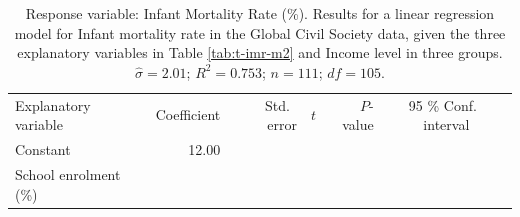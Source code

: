 \documentclass[11pt,a4paper,openany]{book}
\begin{document}
\begin{longtable}[]{@{}lrrrrc@{}}
\caption{\label{tab:t-imr-m3} Response variable: Infant Mortality Rate (\%).
Results for a linear regression model for Infant mortality rate in the
Global Civil Society data, given the three explanatory variables in
Table \ref{tab:t-imr-m2} and Income level in three groups.
\(\hat{\sigma}=2.01\); \(R^{2}=0.753\); \(n=111\);
\(df=105\).}\tabularnewline
\toprule
\begin{minipage}[t]{0.44\columnwidth}\raggedright\strut
Explanatory variable\strut
\end{minipage} & \begin{minipage}[t]{0.09\columnwidth}\raggedleft\strut
Coefficient\strut
\end{minipage} & \begin{minipage}[t]{0.05\columnwidth}\raggedleft\strut
Std.~ error\strut
\end{minipage} & \begin{minipage}[t]{0.06\columnwidth}\raggedleft\strut
\(t\)\strut
\end{minipage} & \begin{minipage}[t]{0.08\columnwidth}\raggedleft\strut
\(P\)-value\strut
\end{minipage} & \begin{minipage}[t]{0.10\columnwidth}\centering\strut
95 \% Conf.~ interval\strut
\end{minipage}\tabularnewline
\begin{minipage}[t]{0.44\columnwidth}\raggedright\strut
Constant\strut
\end{minipage} & \begin{minipage}[t]{0.09\columnwidth}\raggedleft\strut
12.00\strut
\end{minipage} & \begin{minipage}[t]{0.05\columnwidth}\raggedleft\strut
\strut
\end{minipage} & \begin{minipage}[t]{0.06\columnwidth}\raggedleft\strut
\strut
\end{minipage} & \begin{minipage}[t]{0.08\columnwidth}\raggedleft\strut
\strut
\end{minipage} & \begin{minipage}[t]{0.10\columnwidth}\centering\strut
\strut
\end{minipage}\tabularnewline
\begin{minipage}[t]{0.44\columnwidth}\raggedright\strut
School enrolment (\%)\strut
\end{minipage} & \begin{minipage}[t]{0.09\columnwidth}\raggedleft\strut

\end{minipage}
\end{longtable}
\end{document}
